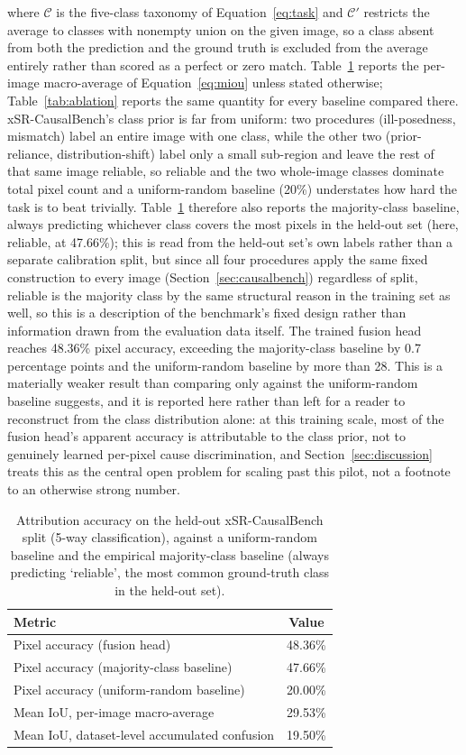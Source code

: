 \documentclass[review]{elsarticle}
\begin{document}
where $\mathcal{C}$ is the five-class taxonomy of Equation~\ref{eq:task} and $\mathcal{C}'$ restricts the average to classes with nonempty union on the given image, so a class absent from both the prediction and the ground truth is excluded from the average entirely rather than scored as a perfect or zero match. Table~\ref{tab:attribution} reports the per-image macro-average of Equation~\ref{eq:miou} unless stated otherwise; Table~\ref{tab:ablation} reports the same quantity for every baseline compared there. xSR-CausalBench's class prior is far from uniform: two procedures (ill-posedness, mismatch) label an entire image with one class, while the other two (prior-reliance, distribution-shift) label only a small sub-region and leave the rest of that same image reliable, so reliable and the two whole-image classes dominate total pixel count and a uniform-random baseline (20\%) understates how hard the task is to beat trivially. Table~\ref{tab:attribution} therefore also reports the majority-class baseline, always predicting whichever class covers the most pixels in the held-out set (here, reliable, at 47.66\%); this is read from the held-out set's own labels rather than a separate calibration split, but since all four procedures apply the same fixed construction to every image (Section~\ref{sec:causalbench}) regardless of split, reliable is the majority class by the same structural reason in the training set as well, so this is a description of the benchmark's fixed design rather than information drawn from the evaluation data itself. The trained fusion head reaches 48.36\% pixel accuracy, exceeding the majority-class baseline by 0.7 percentage points and the uniform-random baseline by more than 28. This is a materially weaker result than comparing only against the uniform-random baseline suggests, and it is reported here rather than left for a reader to reconstruct from the class distribution alone: at this training scale, most of the fusion head's apparent accuracy is attributable to the class prior, not to genuinely learned per-pixel cause discrimination, and Section~\ref{sec:discussion} treats this as the central open problem for scaling past this pilot, not a footnote to an otherwise strong number.

\begin{table}[h]
\centering
\caption{Attribution accuracy on the held-out xSR-CausalBench split (5-way classification), against a uniform-random baseline and the empirical majority-class baseline (always predicting `reliable', the most common ground-truth class in the held-out set).}
\label{tab:attribution}
\begin{tabular}{lc}
\toprule
Metric & Value \\
\midrule
Pixel accuracy (fusion head) & 48.36\% \\
Pixel accuracy (majority-class baseline) & 47.66\% \\
Pixel accuracy (uniform-random baseline) & 20.00\% \\
Mean IoU, per-image macro-average & 29.53\% \\
Mean IoU, dataset-level accumulated confusion & 19.50\% \\
\bottomrule
\end{tabular}
\end{table}
\end{document}
